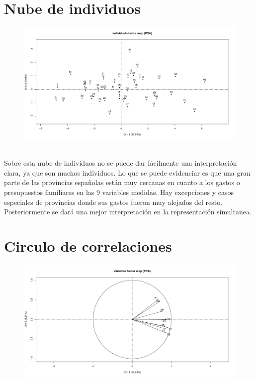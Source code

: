 \documentclass[report,oneside]{revcoles}
\begin{document}
\section{Nube de individuos}
\begin{figure}[h!]
  \centering
  \includegraphics[scale=0.45]{FigurasUV/nubeind.pdf}
\end{figure}
~\\Sobre esta nube de individuos no se puede dar fácilmente una interpretación clara, ya que son muchos individuos. Lo que se puede evidenciar es que una gran parte de las provincias españolas están muy cercanas en cuanto a los gastos o presupuestos familiares en las 9 variables medidas. Hay excepciones y casos especiales de provincias donde sus gastos fueron muy alejados del resto. Posteriormente se dará una mejor interpretación en la representación simultanea.

\section{Circulo de correlaciones}
\begin{figure}[h!]
  \centering
  \includegraphics[scale=0.45]{FigurasUV/nubevar.pdf}
\end{figure}
\end{document}
